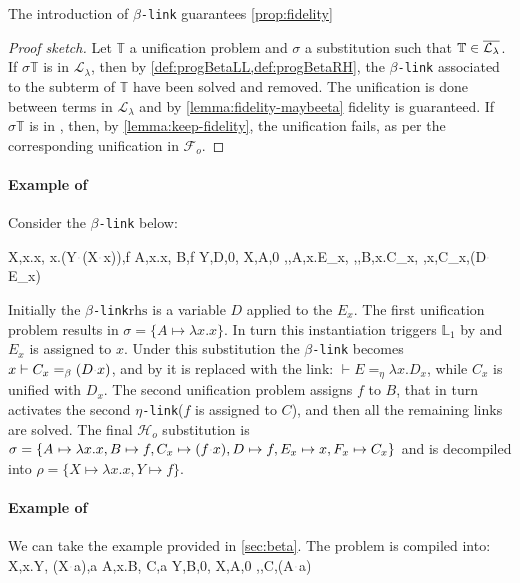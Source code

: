 \documentclass[sigconf,natbib=false,review]{acmart}
\newcommand{\appsep}{\ensuremath{\textcolor{lightgray}{\cdot}}}
\newcommand{\llambda}{\ensuremath{\mathcal{L}_\lambda}\xspace}
\newcommand{\linkMacro}[1]{\ensuremath{#1}\texttt{-link}\xspace}
\newcommand{\linkbeta}{\linkMacro{\beta}}
\newcommand{\linketa} {\linkMacro{\eta}}
\newcommand{\Fo}{\ensuremath{\mathcal{F}_{\!o}\xspace}} %
\newcommand{\Ho}{\ensuremath{\mathcal{H}_o}\xspace}
\newcommand{\linketaM}[3]{\ensuremath{#1 \vdash #2 =_\eta #3}}
\newcommand{\linkbetaM}[3]{\ensuremath{#1 \vdash #2 =_\beta #3}}
\newcommand{\rhs}{\ensuremath{\mathrm{rhs}}\xspace}
\newcommand{\linkStore}{\ensuremath{\mathbb{L}}\xspace}
\newcommand{\hoUnifPb}{\ensuremath{\mathbb{T}}\xspace}
\begin{document}
\begin{lemma}[Fidelity with \linkbeta]
  The introduction of \linkbeta guarantees \cref{prop:fidelity} 
\end{lemma}

\begin{proof}[Proof sketch]
  Let \hoUnifPb a unification problem and $\sigma$ a substitution
  such that $\hoUnifPb \in \notllambda$. 
  If $\sigma\hoUnifPb$ is in \llambda, then by
  \cref{def:progBetaLL,def:progBetaRH}, the \linkbeta associated to the subterm of
  \hoUnifPb have been solved and removed. The
  unification is done between terms in \llambda and by \cref{lemma:fidelity-maybeeta}
  fidelity is guaranteed. If $\sigma\hoUnifPb$ is in \notllambda,
  then, by \cref{lemma:keep-fidelity}, the unification fails, as per the
  corresponding unification in \Fo{}.
\end{proof}

\paragraph{Example of \progBetaLL}
Consider the \linkbeta below:

\printAlll
  {{{X,\lambda x.x},
    {\lambda x.(Y\appsep (X\appsep x)),f}}}
  {{{A,\lambda x.x},
    {B,f}}}
  {{{Y,D,0},
    {X,A,0}}}
  {{{\eta,,A,\lambda x.E_{x}},
    {\eta,,B,\lambda x.C_{x}},
    {\beta,x,C_{x},(D\appsep E_{x})}}}

\noindent
Initially the \linkbeta \rhs is a variable $D$ applied to the $E_x$.
The first unification problem results in $\sigma =
\{A \mapsto \lambda x.x\}$. In turn this instantiation
triggers $\linkStore_1$ by \progressetaleft 
and $E_x$ is assigned to $x$.
Under this substitution the \linkbeta becomes
\linkbetaM{x}{C_x}{(D \appsep x)}, and by \progBetaLL
it is replaced with the link:
\linketaM{}{E}{\lambda x.D_x}, while $C_x$ is unified with $D_x$. The second unification
problem assigns $f$ to $B$, that in turn activates
the second \linketa ($f$ is assigned to $C$), and then all the remaining links
are solved. The final \Ho substitution is $\sigma = \{A _{} \mapsto \lambda x.x, 
B _{} \mapsto f, C _{x} \mapsto (f\appsep x), 
D _{} \mapsto f, E _{x} \mapsto x, F _{x} \mapsto C_{x} \}$ and is decompiled into $\rho = \{X \mapsto \lambda x.x,
Y \mapsto f\}$.

\paragraph{Example of \progBetaRH}
We can take the example provided in \cref{sec:beta}. The problem is compiled
into:
%
\printAlll
  {{{X,\lambda x.Y},
    {(X\appsep a),a}}}
  {{{A,\lambda x.B},
    {C,a}}}
  {{{Y,B,0},
    {X,A,0}}}
  {{{\beta,,C,(A\appsep a)}}}
\end{document}
